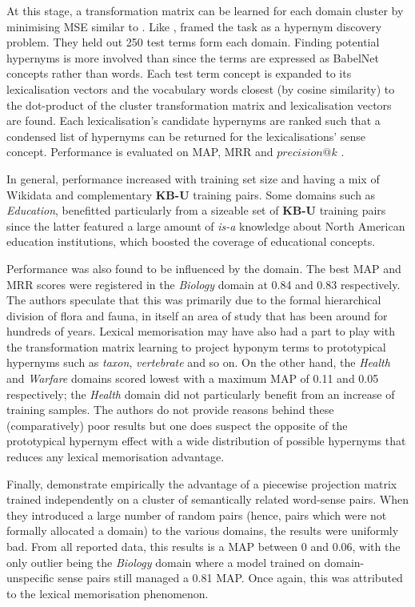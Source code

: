 At this stage, a transformation matrix can be learned for each domain cluster by minimising \ac{MSE} similar to \citep{Fu2014}.  Like \citeauthor{ustalov2017negative}, \citeauthor{espinosa2016supervised} framed the task as a hypernym discovery problem.  They held out 250 test terms form each domain.  Finding potential hypernyms is more involved than \citep{ustalov2017negative} since the terms are expressed as BabelNet concepts rather than words.  Each test term concept is expanded to its lexicalisation vectors and the vocabulary words closest (by cosine similarity) to the dot-product of the cluster transformation matrix and lexicalisation vectors are found.  Each lexicalisation’s candidate hypernyms are ranked such that a condensed list of hypernyms can be returned for the lexicalisations’ sense concept.  Performance is evaluated on \ac{MAP}, \ac{MRR} and $precision@k$ .

In general, performance increased with training set size and having a mix of Wikidata and complementary \textbf{KB-U} training pairs.   Some domains such as \textit{Education}, benefitted particularly from a sizeable set of \textbf{KB-U} training pairs since the latter featured a large amount of \textit{is-a} knowledge about North American education institutions, which boosted the coverage of educational concepts.

Performance was also found to be influenced by the domain.  The best \ac{MAP} and \ac{MRR} scores were registered in the \textit{Biology} domain at 0.84 and 0.83 respectively.  The authors speculate that this was primarily due to the formal hierarchical division of flora and fauna, in itself an area of study that has been around for hundreds of years.  Lexical memorisation \citep{levy2015supervised} may have also had a part to play with the transformation matrix learning to project hyponym terms to prototypical hypernyms such as \textit{taxon}, \textit{vertebrate} and so on.   On the other hand, the \textit{Health} and \textit{Warfare} domains scored lowest with a maximum \ac{MAP} of 0.11 and 0.05 respectively; the \textit{Health} domain did not particularly benefit from an increase of training samples.  The authors do not provide reasons behind these (comparatively) poor results but one does suspect the opposite of the prototypical hypernym effect with a wide distribution of possible hypernyms that reduces any lexical memorisation advantage.

Finally, \citeauthor{espinosa2016supervised} demonstrate empirically the advantage of a piecewise projection matrix trained independently on a cluster of semantically related word-sense pairs.  When they introduced a large number of random pairs (hence, pairs which were not formally allocated a domain) to the various domains, the results were uniformly bad.  From all reported data, this results is a \ac{MAP} between 0 and 0.06, with the only outlier being the \textit{Biology} domain where a model trained on domain-unspecific sense pairs still managed a 0.81 \ac{MAP}.  Once again, this was attributed to the lexical memorisation phenomenon. 

